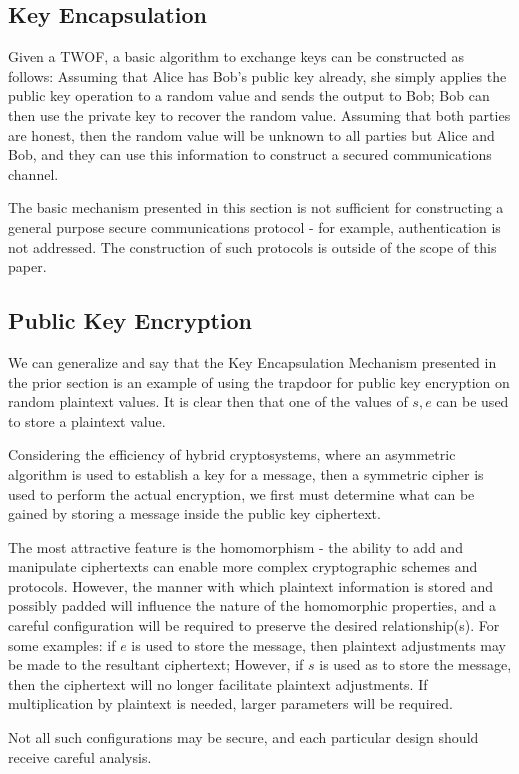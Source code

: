 \documentclass[preprint]{iacrtrans}
\begin{document}
\subsection{Key Encapsulation}
Given a TWOF, a basic algorithm to exchange keys can be constructed as follows: Assuming that Alice has Bob's public key already, she simply applies the public key operation to a random value and sends the output to Bob; Bob can then use the private key to recover the random value. Assuming that both parties are honest, then the random value will be unknown to all parties but Alice and Bob, and they can use this information to construct a secured communications channel.

The basic mechanism presented in this section is not sufficient for constructing a general purpose secure communications protocol - for example, authentication is not addressed. The construction of such protocols is outside of the scope of this paper. 

\subsection{Public Key Encryption}
We can generalize and say that the Key Encapsulation Mechanism presented in the prior section is an example of using the trapdoor for public key encryption on random plaintext values. It is clear then that one of the values of $s, e$ can be used to store a plaintext value.

Considering the efficiency of hybrid cryptosystems, where an asymmetric algorithm is used to establish a key for a message, then a symmetric cipher is used to perform the actual encryption, we first must determine what can be gained by storing a message inside the public key ciphertext.

The most attractive feature is the homomorphism - the ability to add and manipulate ciphertexts can enable more complex cryptographic schemes and protocols. However, the manner with which plaintext information is stored and possibly padded will influence the nature of the homomorphic properties, and a careful configuration will be required to preserve the desired relationship(s). For some examples: if $e$ is used to store the message, then plaintext adjustments may be made to the resultant ciphertext; However, if $s$ is used as to store the message, then the ciphertext will no longer facilitate plaintext adjustments. If multiplication by plaintext is needed, larger parameters will be required.

Not all such configurations may be secure, and each particular design should receive careful analysis.
\end{document}
